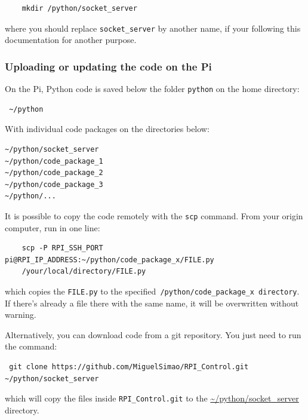 \documentclass[twoside,a4paper]{refart}
\begin{document}
\begin{verbatim}
	mkdir /python/socket_server
\end{verbatim}
where you should replace {\tt socket\_server} by another name, if your following this documentation for another purpose.

\subsubsection{Uploading or updating the code on the Pi}
On the Pi, Python code is saved below the folder {\tt python} on the home directory:
\begin{verbatim} ~/python \end{verbatim}
With individual code packages on the directories below:
\begin{verbatim}
~/python/socket_server
~/python/code_package_1
~/python/code_package_2
~/python/code_package_3
~/python/...
\end{verbatim}

 It is possible to copy the code remotely with the {\tt scp} command. From your origin computer, run in one line:
\begin{verbatim}
	scp -P RPI_SSH_PORT pi@RPI_IP_ADDRESS:~/python/code_package_x/FILE.py
	/your/local/directory/FILE.py
\end{verbatim}
which copies the {\tt FILE.py} to the specified{\tt ~/python/code\_package\_x directory}. \attention If there's already a file there with the same name, it will be overwritten without warning.

Alternatively, you can download code from a git repository\footnotemark. You just need to run the command:

\begin{verbatim} git clone https://github.com/MiguelSimao/RPI_Control.git
~/python/socket_server
\end{verbatim}
which will copy the files inside {\tt RPI\_Control.git} to the \url{~/python/socket\_server} directory.

\end{document}
